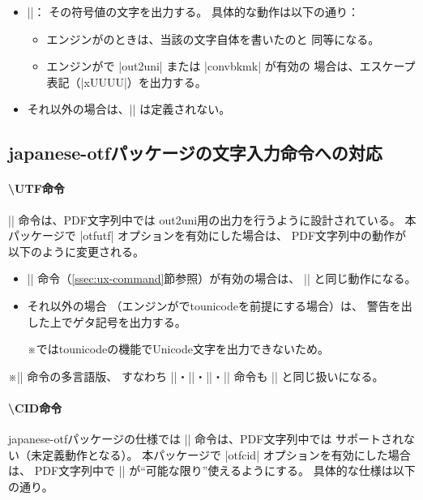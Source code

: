 \documentclass[uplatex,dvipdfmx,a4paper]{jsarticle}
\newcommand{\Pkg}[1]{\textsf{#1}}
\newcommand{\Note}{\par\noindent ※}
\newcommand{\Means}{：\quad}
\begin{document}
\begin{itemize}
\item ||\Means
  その符号値の文字を出力する。
  具体的な動作は以下の通り：
  \begin{itemize}
  \item エンジンが{\upLaTeX}のときは、当該の文字自体を書いたのと
  同等になる。
  \item エンジンが{\pLaTeX}で |out2uni| または |convbkmk| が有効の
  場合は、エスケープ表記（|\0xUUUU|）を出力する。
  \end{itemize}
  \item それ以外の場合は、|\Ux| は定義されない。
\end{itemize}

\subsection{\Pkg{japanese-otf}パッケージの文字入力命令への対応}
\label{ssec:otf-package}

\paragraph{\textbackslash UTF命令}
|\UTF| 命令は、PDF文字列中では
out2uni用の出力を行うように設計されている。
本パッケージで |otfutf| オプションを有効にした場合は、
PDF文字列中の動作が以下のように変更される。

\begin{itemize}
\item |\Ux| 命令（\ref{ssec:ux-command}節参照）が有効の場合は、
  |\Ux| と同じ動作になる。
\item それ以外の場合
  （エンジンが{\pLaTeX}でtounicodeを前提にする場合）は、
  警告を出した上でゲタ記号を出力する。
  \Note {\pLaTeX}ではtounicodeの機能でUnicode文字を出力できないため。
\end{itemize}

\Note |\UTF| 命令の多言語版、
すなわち |\UTFC|・|\UTFK|・|\UTFM|・|\UTFT| 命令も |\UTF|
と同じ扱いになる。

\paragraph{\textbackslash CID命令}
\Pkg{japanese-otf}パッケージの仕様では |\CID| 命令は、PDF文字列中では
サポートされない（未定義動作となる）。
本パッケージで |otfcid| オプションを有効にした場合は、
PDF文字列中で |\CID| が“可能な限り”使えるようにする。
具体的な仕様は以下の通り。
\end{document}
